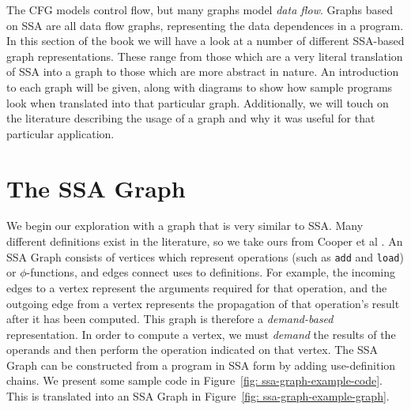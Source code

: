 The CFG models control flow, but many graphs model \textit{data flow}. Graphs based on SSA are all data flow graphs, representing the data dependences in a program. In this section of the book we will have a look at a number of different SSA-based graph representations. These range from those which are a very literal translation of SSA into a graph to those which are more abstract in nature. An introduction to each graph will be given, along with diagrams to show how sample programs look when translated into that particular graph. Additionally, we will touch on the literature describing the usage of a  graph and why it was useful for that particular application.


\section{The SSA Graph}

We begin our exploration with a graph that is very similar to SSA. Many different definitions exist in the literature, so we take ours from Cooper et al \cite{504710}. An SSA Graph consists of vertices which represent operations (such as \texttt{add} and \texttt{load}) or $\mathtt{\phi}$-functions, and edges connect uses to definitions. For example, the incoming edges to a vertex represent the arguments required for that operation, and the outgoing edge from a vertex represents the propagation of that operation's result after it has been computed. This graph is therefore a \textit{demand-based} representation. In order to compute a vertex, we must \textit{demand} the results of the operands and then perform the operation indicated on that vertex. The SSA Graph can be constructed from a program in SSA form by adding use-definition chains. We present some sample code in Figure~\ref{fig: ssa-graph-example-code}. This is translated into an SSA Graph in Figure~\ref{fig: ssa-graph-example-graph}. 


